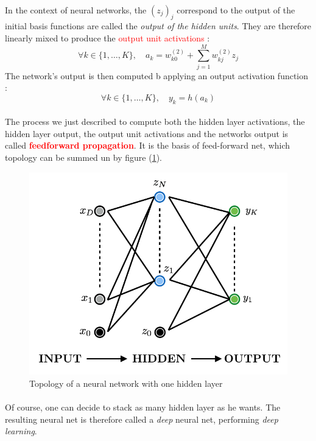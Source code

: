 \documentclass[a4paper]{article}
\begin{document}
{{		\paragraph{} In the context of neural networks, the $(z_j)_j$ correspond to the output of the initial basis functions are called the \emph{output of the hidden units}. They are therefore linearly mixed to produce the {\textcolor{red}{output unit activations}} : 
		\begin{equation}
			\forall{k}\in\{1,\hdots,K\}, \quad a_k = w_{k0}^{(2)} + \sum_{j=1}^M w_{kj}^{(2)}z_j
		\end{equation}
		The network's output is then computed b applying an output activation function : 
		\begin{equation}
			\forall{k}\in\{1,\hdots,K\}, \quad y_k = h(a_k)
		\end{equation}
		
		\paragraph{} The process we just described to compute both the hidden layer activations, the hidden layer output, the output unit activations and the networks output is called \textbf{\textcolor{red}{feedforward propagation}}. It is the basis of feed-forward net, which topology can be summed un by figure (\ref{feed_forward_topo}). 
		
		\begin{figure}[h!]
			\begin{center}
				\includegraphics[width=0.5\linewidth]{nn_ff_topo}
				\caption{Topology of a neural network with one hidden layer}
				\label{feed_forward_topo}
			\end{center}
		\end{figure}
		
		\paragraph{} Of course, one can decide to stack as many hidden layer as he wants. The resulting neural net is therefore called a \emph{deep} neural net, performing \emph{deep learning}. 
		}	
		
}
\end{document}
